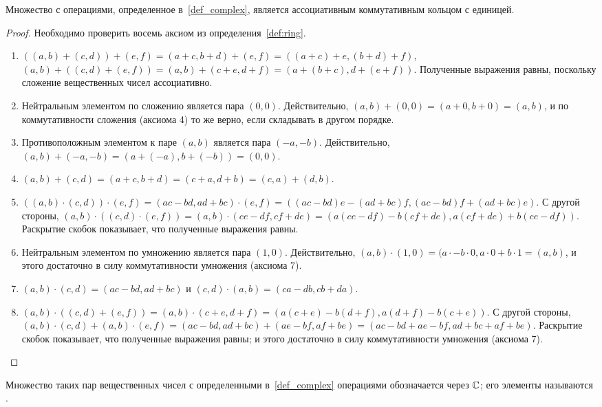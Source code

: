 \begin{theorem}\label{complex_ring}
Множество с операциями, определенное в~\ref{def_complex}, является
ассоциативным коммутативным кольцом с единицей.
\end{theorem}
\begin{proof}
Необходимо проверить восемь аксиом из определения~\ref{def:ring}.
\begin{enumerate}
\item $((a,b)+(c,d))+(e,f)=(a+c,b+d)+(e,f)=((a+c)+e,(b+d)+f)$,
  $(a,b)+((c,d)+(e,f))=(a,b)+(c+e,d+f)=(a+(b+c),d+(e+f))$. Полученные
  выражения равны, поскольку сложение вещественных чисел ассоциативно.
\item Нейтральным элементом по сложению является пара
  $(0,0)$. Действительно, $(a,b)+(0,0)=(a+0,b+0)=(a,b)$, и по
  коммутативности сложения (аксиома 4) то же верно, если складывать в
  другом порядке.
\item Противоположным элементом к паре $(a,b)$ является пара
  $(-a,-b)$. Действительно, $(a,b)+(-a,-b)=(a+(-a),b+(-b))=(0,0)$.
\item $(a,b)+(c,d)=(a+c,b+d)=(c+a,d+b)=(c,a)+(d,b)$.
\item $((a,b)\cdot(c,d))\cdot(e,f)=(ac-bd,ad+bc)\cdot(e,f)
  =((ac-bd)e-(ad+bc)f,(ac-bd)f+(ad+bc)e)$. С другой стороны,
  $(a,b)\cdot((c,d)\cdot(e,f))=(a,b)\cdot(ce-df,cf+de)
  =(a(ce-df)-b(cf+de),a(cf+de)+b(ce-df))$. Раскрытие скобок
  показывает, что полученные выражения равны.
\item Нейтральным элементом по умножению является пара
  $(1,0)$. Действительно, $(a,b)\cdot(1,0)=(a\cdot-b\cdot 0,a\cdot
  0+b\cdot 1=(a,b)$, и этого достаточно в силу коммутативности
  умножения (аксиома 7).
\item $(a,b)\cdot (c,d)=(ac-bd,ad+bc)$ и $(c,d)\cdot
  (a,b)=(ca-db,cb+da)$.
\item $(a,b)\cdot ((c,d)+(e,f))=(a,b)\cdot
  (c+e,d+f)=(a(c+e)-b(d+f),a(d+f)-b(c+e))$. С другой стороны,
  $(a,b)\cdot (c,d) + (a,b)\cdot (e,f)=(ac-bd,ad+bc)+(ae-bf,af+be)
  =(ac-bd+ae-bf,ad+bc+af+be)$. Раскрытие скобок показывает, что
  полученные выражения равны; и этого достаточно в силу
  коммутативности умножения (аксиома 7).
\end{enumerate}
\end{proof}

\begin{definition}
Множество таких пар вещественных чисел с определенными
в~\ref{def_complex} операциями
обозначается через $\mathbb C$; его элементы называются .
\end{definition}

